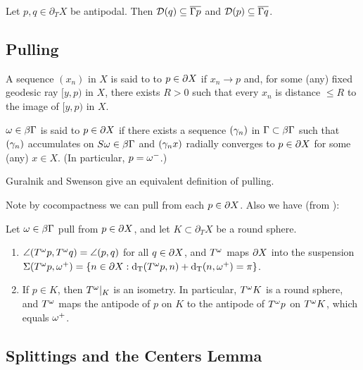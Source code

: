\documentclass{amsart}
\renewcommand{\setp}[2]{\left\{#1 : #2\right\}}
\newcommand{\bdT}{\partial_T}
\begin{document}
\begin{corollary}  		\label{antipodal pi-convergence 2}
Let $p, q \in \bdT X$ be antipodal.  Then $\operatorname{\mathcal D}(q) \subseteq \overline{\Gamma p}$ and $\operatorname{\mathcal D}(p) \subseteq \overline{\Gamma q}$. \end{corollary}

\subsection{Pulling}

A sequence $(x_n)$ in $X$ is said to  to $p \in \partial X$ if $x_n \to p$ and, for some (any) fixed geodesic ray $[y, p)$ in $X$, there exists $R > 0$ such that every $x_n$ is distance $\le R$ to the image of $[y, p)$ in $X$.

\begin{definition}
$\omega \in \beta \Gamma$ is said to  $p \in \partial X$ if there exists a sequence $(\gamma_n)$ in $\Gamma \subset \beta \Gamma$ such that $(\gamma_n)$ accumulates on $S\omega \in \beta \Gamma$ and $(\gamma_n x)$ radially converges to $p \in \partial X$ for some (any) $x \in X$.
(In particular, $p = \omega^-$.)
\end{definition}

\begin{remark}
Guralnik and Swenson \cite{gs} give an equivalent definition of pulling.
\end{remark}

Note by cocompactness we can pull from each $p \in \partial X$.
Also we have (from \cite{gs}):

\begin{proposition}		\label{pulling}
Let $\omega \in \beta \Gamma$ pull from $p \in \partial X$, and let $K \subset \bdT X$ be a round sphere.
\begin{enumerate}
\item  $\angle(T^{\omega} p, T^{\omega} q) = \angle(p, q)$ for all $q \in \partial X$, and $T^{\omega}$ maps $\partial X$ into the suspension $\susp (T^{\w} p, \w^+) = \setp{n \in \bd X}{\dT(T^{\w} p, n) + \dT(n, \w^+) = \pi}$.
\item  If $p \in K$, then $T^{\omega} \vert_{K}$ is an isometry.
In particular, $T^{\omega} K$ is a round sphere, and $T^{\omega}$ maps the antipode of $p$ on $K$ to the antipode of $T^{\omega} p$ on $T^{\omega} K$, which equals $\omega^+$.
\end{enumerate}
\end{proposition}


\subsection{Splittings and the Centers Lemma}
\end{document}
